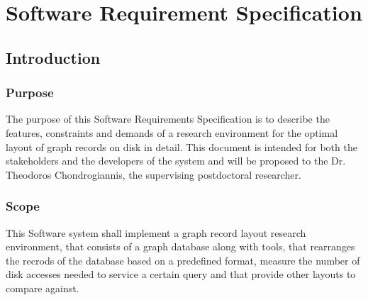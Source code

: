 \section{Software Requirement Specification}

\subsection{Introduction}
	\subsubsection{Purpose}
			The purpose of this Software Requirements Specification is to describe the features, constraints and demands of a research environment for the optimal layout of graph records on disk in detail. This document is intended for both the stakeholders and the developers of the system and will be proposed to the Dr. Theodoros Chondrogiannis, the supervising postdoctoral researcher.
	\subsubsection{Scope}
			This Software system shall implement a graph record layout research environment, that consists of a graph database along with tools, that rearranges the recrods of the database based on a predefined format, measure the number of disk accesses needed to service a certain query and that provide other layouts to compare against.

